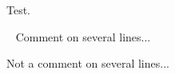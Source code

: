 \documentclass[10pt,a4paper]{article}
\begin{document}
Test.

~%
Comment
on
several
lines...

Not
a comment
on
several
lines...
\end{document}
